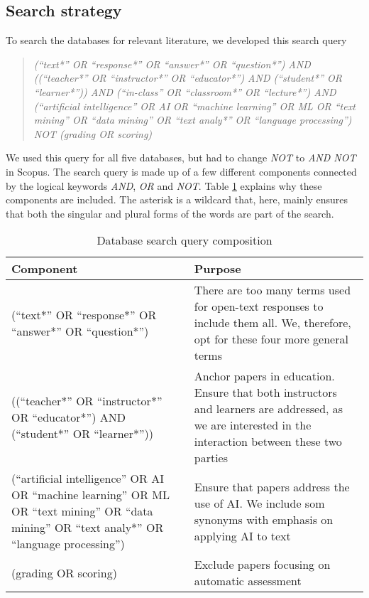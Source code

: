 \subsection{Search strategy}

To search the databases for relevant literature, we developed this search query

\begin{quote}
    \textit{(``text*'' OR ``response*'' OR ``answer*'' OR ``question*'') AND ((``teacher*'' OR ``instructor*'' OR ``educator*'') AND (``student*'' OR ``learner*'')) AND (``in-class'' OR ``classroom*'' OR ``lecture*'') AND (``artificial intelligence'' OR AI OR ``machine learning'' OR ML OR ``text mining'' OR ``data mining'' OR ``text analy*'' OR ``language processing'') NOT (grading OR scoring)}
\end{quote}

We used this query for all five databases, but had to change \textit{NOT} to \textit{AND NOT} in Scopus. The search query is made up of a few different components connected by the logical keywords \textit{AND}, \textit{OR} and \textit{NOT}. Table \ref{tab:searchquery} explains why these components are included. The asterisk is a wildcard that, here, mainly ensures that both the singular and plural forms of the words are part of the search.

\begin{table}[h!]
\centering
\caption{Database search query composition}
\label{tab:searchquery}
\begin{tabularx}{\textwidth}{|X|X|}
\hline
\textbf{Component} & \textbf{Purpose} \\
\hline
(``text*'' OR ``response*'' OR ``answer*'' OR ``question*'') & There are too many terms used for open-text responses to include them all. We, therefore, opt for these four more general terms \\
\hline
((``teacher*'' OR ``instructor*'' OR ``educator*'') AND (``student*'' OR ``learner*'')) & Anchor papers in education. Ensure that both instructors and learners are addressed, as we are interested in the interaction between these two parties \\
\hline
(``artificial intelligence'' OR AI OR ``machine learning'' OR ML OR ``text mining'' OR ``data mining'' OR ``text analy*'' OR ``language processing'') & Ensure that papers address the use of AI. We include som synonyms with emphasis on applying AI to text \\
\hline
(grading OR scoring) & Exclude papers focusing on automatic assessment \\
\hline
\end{tabularx}
\end{table}

